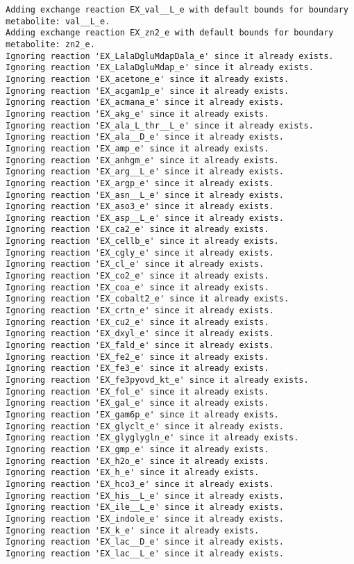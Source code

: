 \documentclass[
  letterpaper,
  DIV=11,
  numbers=noendperiod]{scrartcl}
\begin{document}
\begin{verbatim}
Adding exchange reaction EX_val__L_e with default bounds for boundary metabolite: val__L_e.
Adding exchange reaction EX_zn2_e with default bounds for boundary metabolite: zn2_e.
Ignoring reaction 'EX_LalaDgluMdapDala_e' since it already exists.
Ignoring reaction 'EX_LalaDgluMdap_e' since it already exists.
Ignoring reaction 'EX_acetone_e' since it already exists.
Ignoring reaction 'EX_acgam1p_e' since it already exists.
Ignoring reaction 'EX_acmana_e' since it already exists.
Ignoring reaction 'EX_akg_e' since it already exists.
Ignoring reaction 'EX_ala_L_thr__L_e' since it already exists.
Ignoring reaction 'EX_ala__D_e' since it already exists.
Ignoring reaction 'EX_amp_e' since it already exists.
Ignoring reaction 'EX_anhgm_e' since it already exists.
Ignoring reaction 'EX_arg__L_e' since it already exists.
Ignoring reaction 'EX_argp_e' since it already exists.
Ignoring reaction 'EX_asn__L_e' since it already exists.
Ignoring reaction 'EX_aso3_e' since it already exists.
Ignoring reaction 'EX_asp__L_e' since it already exists.
Ignoring reaction 'EX_ca2_e' since it already exists.
Ignoring reaction 'EX_cellb_e' since it already exists.
Ignoring reaction 'EX_cgly_e' since it already exists.
Ignoring reaction 'EX_cl_e' since it already exists.
Ignoring reaction 'EX_co2_e' since it already exists.
Ignoring reaction 'EX_coa_e' since it already exists.
Ignoring reaction 'EX_cobalt2_e' since it already exists.
Ignoring reaction 'EX_crtn_e' since it already exists.
Ignoring reaction 'EX_cu2_e' since it already exists.
Ignoring reaction 'EX_dxyl_e' since it already exists.
Ignoring reaction 'EX_fald_e' since it already exists.
Ignoring reaction 'EX_fe2_e' since it already exists.
Ignoring reaction 'EX_fe3_e' since it already exists.
Ignoring reaction 'EX_fe3pyovd_kt_e' since it already exists.
Ignoring reaction 'EX_fol_e' since it already exists.
Ignoring reaction 'EX_gal_e' since it already exists.
Ignoring reaction 'EX_gam6p_e' since it already exists.
Ignoring reaction 'EX_glyclt_e' since it already exists.
Ignoring reaction 'EX_glyglygln_e' since it already exists.
Ignoring reaction 'EX_gmp_e' since it already exists.
Ignoring reaction 'EX_h2o_e' since it already exists.
Ignoring reaction 'EX_h_e' since it already exists.
Ignoring reaction 'EX_hco3_e' since it already exists.
Ignoring reaction 'EX_his__L_e' since it already exists.
Ignoring reaction 'EX_ile__L_e' since it already exists.
Ignoring reaction 'EX_indole_e' since it already exists.
Ignoring reaction 'EX_k_e' since it already exists.
Ignoring reaction 'EX_lac__D_e' since it already exists.
Ignoring reaction 'EX_lac__L_e' since it already exists.

\end{verbatim}
\end{document}
